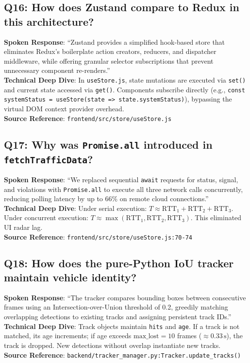 \documentclass[11pt,a4paper,oneside]{report}
\begin{document}
\subsection*{Q16: How does Zustand compare to Redux in this architecture?}
\begin{interviewbox}
\textbf{Spoken Response}: ``Zustand provides a simplified hook-based store that eliminates Redux's boilerplate action creators, reducers, and dispatcher middleware, while offering granular selector subscriptions that prevent unnecessary component re-renders.''\\
\textbf{Technical Deep Dive}: In \texttt{useStore.js}, state mutations are executed via \texttt{set()} and current state accessed via \texttt{get()}. Components subscribe directly (e.g., \texttt{const systemStatus = useStore(state => state.systemStatus)}), bypassing the virtual DOM context provider overhead.\\
\textbf{Source Reference}: \texttt{frontend/src/store/useStore.js}
\end{interviewbox}

\subsection*{Q17: Why was \texttt{Promise.all} introduced in \texttt{fetchTrafficData}?}
\begin{interviewbox}
\textbf{Spoken Response}: ``We replaced sequential \texttt{await} requests for status, signal, and violations with \texttt{Promise.all} to execute all three network calls concurrently, reducing polling latency by up to 66\% on remote cloud connections.''\\
\textbf{Technical Deep Dive}: Under serial execution: $T \approx \text{RTT}_1 + \text{RTT}_2 + \text{RTT}_3$. Under concurrent execution: $T \approx \max(\text{RTT}_1, \text{RTT}_2, \text{RTT}_3)$. This eliminated UI radar lag.\\
\textbf{Source Reference}: \texttt{frontend/src/store/useStore.js:70-74}
\end{interviewbox}

\subsection*{Q18: How does the pure-Python IoU tracker maintain vehicle identity?}
\begin{interviewbox}
\textbf{Spoken Response}: ``The tracker compares bounding boxes between consecutive frames using an Intersection-over-Union threshold of 0.2, greedily matching overlapping detections to existing tracks and assigning persistent track IDs.''\\
\textbf{Technical Deep Dive}: Track objects maintain \texttt{hits} and \texttt{age}. If a track is not matched, its age increments; if age exceeds $\text{max\_lost} = 10$ frames ($\approx 0.33\,\text{s}$), the track is dropped. New detections without overlap instantiate new tracks.\\
\textbf{Source Reference}: \texttt{backend/tracker\_manager.py:Tracker.update\_tracks()}
\end{interviewbox}
\end{document}
